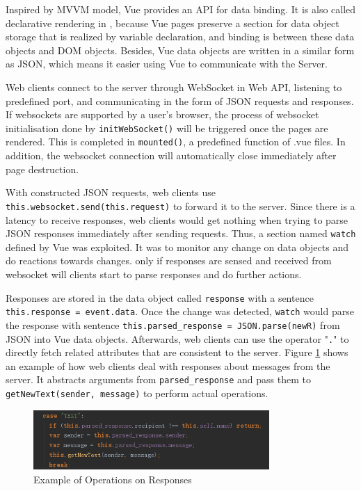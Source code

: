 Inspired by MVVM model, Vue provides an API for data binding. It is also called declarative rendering in \cite{vue}, because Vue pages preserve a section for data object storage that is realized by variable declaration, and binding is between these data objects and DOM objects. Besides, Vue data objects are written in a similar form as JSON, which means it easier using Vue to communicate with the Server. 

Web clients connect to the server through WebSocket in Web API, listening to predefined port, and communicating in the form of JSON requests and responses. If websockets are supported by a user's browser, the process of websocket initialisation done by \texttt{initWebSocket()} will be triggered once the pages are rendered. This is completed in \texttt{mounted()}, a predefined function of .vue files. In addition, the websocket connection will automatically close immediately after page destruction.

With constructed JSON requests, web clients use \texttt{this.websocket.send(this.request)} to forward it to the server. Since there is a latency to receive responses, web clients would get nothing when trying to parse JSON responses immediately after sending requests. Thus, a section named \texttt{watch} defined by Vue was exploited. It was to monitor any change on data objects and do reactions towards changes. only if responses are sensed and received from websocket will clients start to parse responses and do further actions.

Responses are stored in the data object called \texttt{response} with a sentence \texttt{this.response = event.data}. Once the change was detected, \texttt{watch} would parse the response with sentence \texttt{this.parsed\_response = JSON.parse(newR)} from JSON into Vue data objects. Afterwards, web clients can use the operator "\texttt{.}" to directly fetch related attributes that are consistent to the server. Figure \ref{tab:code-example} shows an example of how web clients deal with responses about messages from the server. It abstracts arguments from \texttt{parsed\_response} and pass them to \texttt{getNewText(sender, message)} to perform actual operations.

\begin{figure}[H]
 \centering
  \includegraphics[width=0.8\textwidth]{images/code-example.png}
  \caption{Example of Operations on Responses}
  \label{tab:code-example}
\end{figure}

